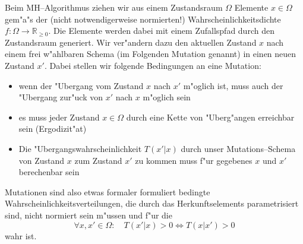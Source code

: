 	Beim MH--Algorithmus ziehen wir aus einem Zustandsraum $\Omega$ Elemente $x \in \Omega$ gem"a"s der (nicht notwendigerweise normierten!) Wahrscheinlichkeitsdichte $f : \Omega \rightarrow \mathbb{R}_{\geq 0}$. Die Elemente werden dabei mit einem Zufallspfad durch den Zustandsraum generiert. Wir ver"andern dazu den aktuellen Zustand $x$ nach einem frei w"ahlbaren Schema (im Folgenden Mutation genannt) in einen neuen Zustand $x'$.
	Dabei stellen wir folgende Bedingungen an eine Mutation:
	\begin{itemize}
		\item{wenn der "Ubergang vom Zustand $x$ nach $x'$ m"oglich ist, muss auch der "Ubergang zur"uck von $x'$ nach $x$ m"oglich sein}
		\item{es muss jeder Zustand $x \in \Omega$ durch eine Kette von "Uberg"angen erreichbar sein (Ergodizit"at)}
		\item{Die "Ubergangswahrscheinlichkeit $T(x'|x)$ durch unser Mutations--Schema von Zustand $x$ zum Zustand $x'$ zu kommen muss f"ur gegebenes $x$ und $x'$ berechenbar sein}
	\end{itemize}
	Mutationen sind also etwas formaler formuliert bedingte Wahrscheinlichkeitsverteilungen, die durch das Herkunftselements parametrisiert sind, nicht normiert sein m"ussen und f"ur die
	$$\forall x,x'\in\Omega : \quad T(x'|x)>0 \Leftrightarrow T(x|x')>0$$
	wahr ist.
	
